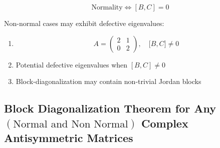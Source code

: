 \begin{equation}
\text{Normality} \Leftrightarrow [B,C] = 0
\end{equation}

Non-normal cases may exhibit defective eigenvalues:

\begin{enumerate}
\item 
\begin{equation}
A=\left( 
\begin{array}{cc}
2 & 1 \\ 
0 & 2%
\end{array}%
\right) ,\quad \lbrack B,C]\neq 0
\end{equation}

\item Potential defective eigenvalues when $[B,C]\neq 0$

\item Block-diagonalization may contain non-trivial Jordan blocks
\end{enumerate}

\subsection{Block Diagonalization Theorem for Any $\left( \text{Normal and
Non Normal}\right) $ Complex Antisymmetric Matrices}

